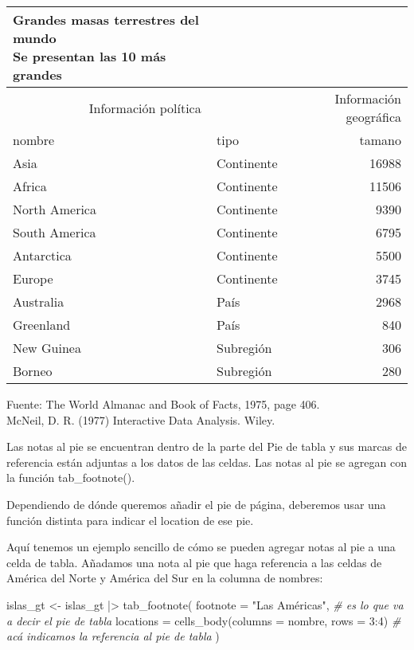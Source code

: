 \documentclass[
]{article}
\newenvironment{Shaded}{\begin{snugshade}}{\end{snugshade}}
\newcommand{\AttributeTok}[1]{\textcolor[rgb]{0.77,0.63,0.00}{#1}}
\newcommand{\CommentTok}[1]{\textcolor[rgb]{0.56,0.35,0.01}{\textit{#1}}}
\newcommand{\DecValTok}[1]{\textcolor[rgb]{0.00,0.00,0.81}{#1}}
\newcommand{\FunctionTok}[1]{\textcolor[rgb]{0.00,0.00,0.00}{#1}}
\newcommand{\NormalTok}[1]{#1}
\newcommand{\OtherTok}[1]{\textcolor[rgb]{0.56,0.35,0.01}{#1}}
\newcommand{\SpecialCharTok}[1]{\textcolor[rgb]{0.00,0.00,0.00}{#1}}
\newcommand{\StringTok}[1]{\textcolor[rgb]{0.31,0.60,0.02}{#1}}
\begin{document}
\setlength{\LTpost}{0mm}
\begin{longtable}{llr}
\caption*{
{\large Grandes masas terrestres del mundo} \\ 
{\small Se presentan las 10 más grandes}
} \\ 
\toprule
\multicolumn{2}{c}{Información política} & Información geográfica \\ 
\cmidrule(lr){1-2} \cmidrule(lr){3-3}
nombre & tipo & tamano \\ 
\midrule
Asia & Continente & 16988 \\ 
Africa & Continente & 11506 \\ 
North America & Continente & 9390 \\ 
South America & Continente & 6795 \\ 
Antarctica & Continente & 5500 \\ 
Europe & Continente & 3745 \\ 
Australia & País & 2968 \\ 
Greenland & País & 840 \\ 
New Guinea & Subregión & 306 \\ 
Borneo & Subregión & 280 \\ 
\bottomrule
\end{longtable}
\begin{minipage}{\linewidth}
Fuente: The World Almanac and Book of Facts, 1975, page 406.\\
McNeil, D. R. (1977) Interactive Data Analysis. Wiley.\\
\end{minipage}

Las notas al pie se encuentran dentro de la parte del Pie de tabla y sus
marcas de referencia están adjuntas a los datos de las celdas. Las notas
al pie se agregan con la función tab\_footnote().

Dependiendo de dónde queremos añadir el pie de página, deberemos usar
una función distinta para indicar el location de ese pie.

Aquí tenemos un ejemplo sencillo de cómo se pueden agregar notas al pie
a una celda de tabla. Añadamos una nota al pie que haga referencia a las
celdas de América del Norte y América del Sur en la columna de nombres:

\begin{Shaded}
\begin{Highlighting}[]
\NormalTok{islas\_gt }\OtherTok{\textless{}{-}}\NormalTok{ islas\_gt }\SpecialCharTok{|\textgreater{}} 
  \FunctionTok{tab\_footnote}\NormalTok{(}
    \AttributeTok{footnote =} \StringTok{"Las Américas"}\NormalTok{, }\CommentTok{\# es lo que va a decir el pie de tabla}
    \AttributeTok{locations =} \FunctionTok{cells\_body}\NormalTok{(}\AttributeTok{columns =}\NormalTok{ nombre, }\AttributeTok{rows =} \DecValTok{3}\SpecialCharTok{:}\DecValTok{4}\NormalTok{) }\CommentTok{\# acá indicamos la referencia al pie de tabla}
\NormalTok{  )}
\end{Highlighting}
\end{Shaded}
\end{document}
